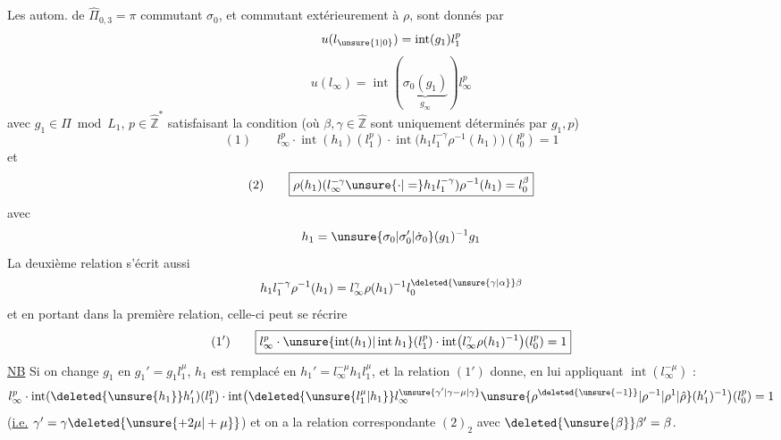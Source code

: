 Les autom.  de $\hat\Pi_{0,3}=\pi$ commutant  $\sigma_0$, et commutant extérieurement à $\rho$, sont donnés par
\[
u(l_{\unsure{1|0}})=\operatorname{int}(g_1)l_1^{p}
\]
\[
u(l_\infty)=\operatorname{int}(\underbrace{\sigma_0(g_1)}_{g_\infty})l_\infty^{p}
\]
avec $g_1\in\Pi\bmod L_1$, $p\in\hat{\mathbb Z}^{*}$ satisfaisant la condition (où $\beta,\gamma\in\hat{\mathbb Z}$ sont uniquement déterminés par $g_1,p$)
\[
(1)\qquad\boxed{l_\infty^{p}\cdot\operatorname{int}(h_1)(l_1^{p})\cdot\operatorname{int}\bigl(h_1l_1^{-\gamma}\rho^{-1}(h_1)\bigr)(l_0^{p})=1}
\]
et
\[
(2)\qquad\boxed{\rho(h_1)(l_\infty^{-\gamma}\unsure{\cdot|=} h_1l_1^{-\gamma})\rho^{-1}(h_1)=l_0^\beta}
\]
avec
\[
h_1=\unsure{\sigma_0|\sigma_0'|\dot\sigma_0}(g_1)^{-1}g_1
\]
La deuxième relation s'écrit aussi
\[
h_1l_1^{-\gamma}\rho^{-1}(h_1)=l_\infty^\gamma\rho(h_1)^{-1}l_0^{\deleted{\unsure{\gamma|\alpha}}\beta}
\]
et en portant dans la première relation, celle-ci peut se récrire
\[
(1')\qquad\boxed{l_\infty^{p}\cdot\unsure{\operatorname{int}(h_1)|\operatorname{int}h_1}(l_1^{p})\cdot\operatorname{int}\bigl(l_\infty^\gamma\rho(h_1)^{-1}\bigr)(l_0^{p})=1}
\]
\uline{NB} Si on change $g_1$ en $g_1'=g_1l_1^\mu$, $h_1$ est remplacé en $h_1'=l_\infty^{-\mu}h_1l_1^\mu$, et la relation $(1')$ donne, en lui appliquant $\operatorname{int}(l_\infty^{-\mu})$ :
\[
l_\infty^{p}\cdot\operatorname{int}(\deleted{\unsure{h_1}}h_1')(l_1^{p})\cdot\operatorname{int}\bigl(\deleted{\unsure{l_1^\mu|h_1}}l_\infty^{\unsure{\gamma'|\gamma-\mu|\gamma}}\unsure{\rho^{\deleted{\unsure{-1}}}|\rho^{-1}|\rho^1|\hat\rho}(h_1')^{-1}\bigr)(l_0^{p})=1
\]
(\uline{i.e.} \uline{$\gamma'=\gamma\deleted{\unsure{+2\mu|+\mu}}$}) et on a la relation correspondante  $(2)_2$ avec $\deleted{\unsure{\beta}}\beta'=\beta$.
